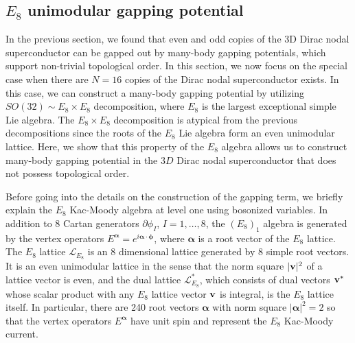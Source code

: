 \subsection{$E_8$ unimodular gapping potential}\label{Chapter:E8}
In the previous section, we found that even and odd copies of the $3$D Dirac nodal superconductor can be gapped out by many-body gapping potentials, which support non-trivial topological order. In this section, we now focus on the special case when there are $N=16$ copies of the Dirac nodal superconductor exists. In this case, we can construct a many-body gapping potential by utilizing $SO(32)\sim E_8\times E_8$ decomposition, where $E_8$ is the largest exceptional simple Lie algebra. The $E_8\times E_8$ decomposition is atypical from the previous decompositions since the roots of the $E_8$ Lie algebra form an even unimodular lattice. Here, we show that this property of the $E_8$ algebra allows us to construct many-body gapping potential in the $3D$ Dirac nodal superconductor that does not possess topological order.

Before going into the details on the construction of the gapping term, we briefly explain the $E_8$ Kac-Moody algebra at level one using bosonized variables. In addition to 8 Cartan generators $\partial\phi_I$, $I=1,\ldots,8$, the $(E_8)_1$ algebra is generated by the vertex operators $E^{\boldsymbol\alpha}=e^{i\boldsymbol\alpha\cdot\boldsymbol\phi}$, where $\boldsymbol\alpha$ is a root vector of the $E_8$ lattice. The $E_8$ lattice $\mathcal{L}_{E_8}$ is an 8 dimensional lattice generated by 8 simple root vectors. It is an even unimodular lattice in the sense that the norm square $|{\bf v}|^2$ of a lattice vector is even, and the dual lattice $\mathcal{L}_{E_8}^\ast$, which consists of dual vectors ${\bf v}^\ast$ whose scalar product with any $E_8$ lattice vector ${\bf v}$ is integral, is the $E_8$ lattice itself. In particular, there are 240 root vectors $\boldsymbol\alpha$ with norm square $|\boldsymbol\alpha|^2=2$ so that the vertex operators $E^{\boldsymbol\alpha}$ have unit spin and represent the $E_8$ Kac-Moody current.


